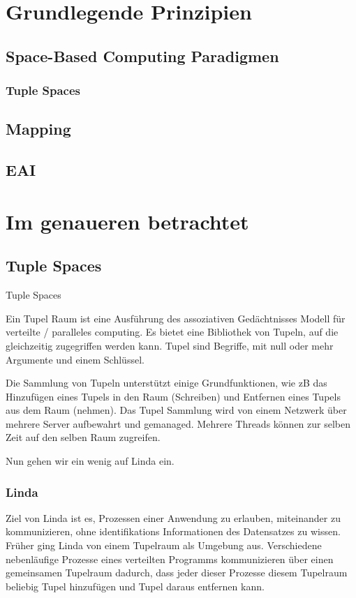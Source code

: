 \documentclass[a4paper,12pt]{scrreprt}
\begin{document}
\chapter{Grundlegende Prinzipien}
	\section{Space-Based Computing Paradigmen}
		\subsection{Tuple Spaces}
			
		
	\section{Mapping}
		
	\section{EAI}
		
\chapter{Im genaueren betrachtet}
	\section{Tuple Spaces}
		Tuple Spaces
		
		Ein Tupel Raum ist eine Ausführung des assoziativen Gedächtnisses Modell für verteilte / paralleles computing. Es bietet eine Bibliothek von Tupeln, auf  die gleichzeitig zugegriffen werden kann. Tupel sind Begriffe, mit null oder mehr Argumente und einem Schlüssel. %
		
		Die Sammlung von Tupeln unterstützt einige Grundfunktionen, wie zB das Hinzufügen eines Tupels in den Raum (Schreiben) und Entfernen eines Tupels aus dem Raum (nehmen). Das Tupel Sammlung wird von einem Netzwerk über mehrere Server aufbewahrt und gemanaged. Mehrere Threads können  zur selben Zeit auf den selben Raum zugreifen.
		
		Nun gehen wir ein wenig auf Linda ein.
		
		\subsection{Linda}
		Ziel von Linda ist es, Prozessen einer Anwendung zu erlauben, miteinander zu kommunizieren, ohne identifikations Informationen des Datensatzes zu wissen. Früher ging Linda  von einem Tupelraum  als Umgebung aus. Verschiedene nebenläufige Prozesse eines verteilten Programms kommunizieren über einen gemeinsamen Tupelraum dadurch, dass jeder dieser Prozesse diesem Tupelraum beliebig Tupel hinzufügen und Tupel daraus entfernen kann.
		
\end{document}
